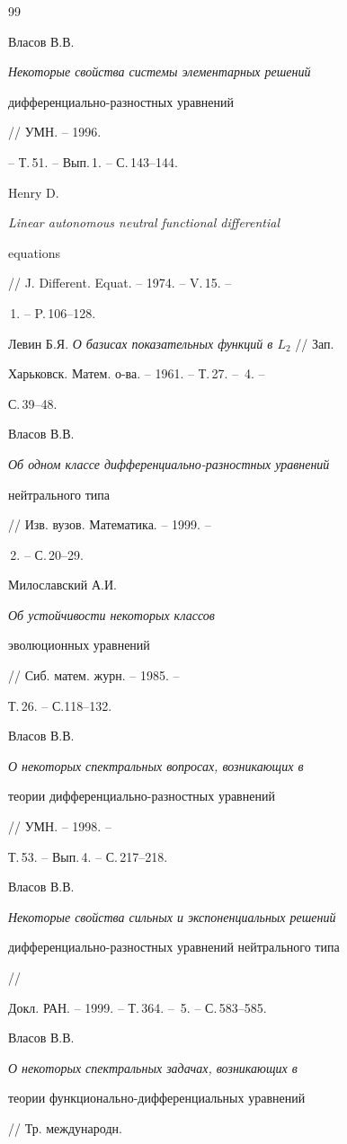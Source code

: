 \begin{thebibliography}{99}


Власов В.В. {\em Некоторые свойства системы элементарных решений 


дифференциально-разностных уравнений} // УМН. -- 1996. 


-- Т.\,51. -- Вып.\,1. -- С.\,143--144. 




Henry D. {\em Linear autonomous neutral functional differential 


equations} // J. Different. Equat. -- 1974. -- V.\,15. -- 


\No\,1. -- P.\,106--128. 




Левин Б.Я. {\em О базисах показательных функций в $L_2$} // Зап. 


Харьковск. Матем. о-ва. -- 1961. -- Т.\,27. -- \No\,4. -- 


С.\,39--48. 




Власов В.В. {\em Об одном классе дифференциально-разностных уравнений 


нейтрального типа} // Изв. вузов. Математика. -- 1999. -- 


\No\,2. -- С.\,20--29. 




Милославский А.И. {\em Об устойчивости некоторых классов


эволюционных уравнений} // Сиб. матем. журн. -- 1985. -- 


Т.\,26. -- С.118--132. 




Власов В.В. {\em О некоторых спектральных вопросах, возникающих в 


теории дифференциально-разностных уравнений} // УМН. -- 1998. -- 


Т.\,53. -- Вып.\,4. -- С.\,217--218. 




Власов В.В. {\em Некоторые свойства сильных и экспоненциальных решений 


дифференциально-разностных уравнений нейтрального типа} // 


Докл. РАН. -- 1999. -- Т.\,364. -- \No\,5. -- С.\,583--585. 




Власов В.В. {\em О некоторых спектральных задачах, возникающих в 


теории функционально-дифференциальных уравнений} // Тр. международн. 



\end{thebibliography}
